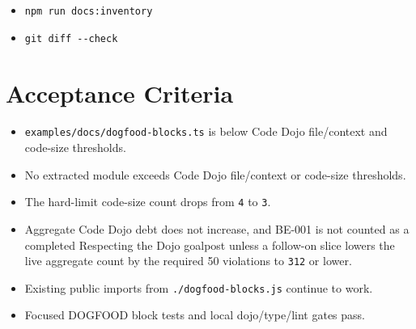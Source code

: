 \begin{itemize}
\item
  \texttt{n\allowbreak{}p\allowbreak{}m\allowbreak{} \allowbreak{}r\allowbreak{}u\allowbreak{}n\allowbreak{} \allowbreak{}d\allowbreak{}o\allowbreak{}c\allowbreak{}s\allowbreak{}:\allowbreak{}i\allowbreak{}n\allowbreak{}v\allowbreak{}e\allowbreak{}n\allowbreak{}t\allowbreak{}o\allowbreak{}r\allowbreak{}y}
\item
  \texttt{g\allowbreak{}i\allowbreak{}t\allowbreak{} \allowbreak{}d\allowbreak{}i\allowbreak{}f\allowbreak{}f\allowbreak{} \allowbreak{}-\allowbreak{}-\allowbreak{}c\allowbreak{}h\allowbreak{}e\allowbreak{}c\allowbreak{}k}
\end{itemize}

\section{Acceptance Criteria}\label{record-253-acceptance-criteria}

\begin{itemize}
\tightlist
\item
  \texttt{e\allowbreak{}x\allowbreak{}a\allowbreak{}m\allowbreak{}p\allowbreak{}l\allowbreak{}e\allowbreak{}s\allowbreak{}/\allowbreak{}d\allowbreak{}o\allowbreak{}c\allowbreak{}s\allowbreak{}/\allowbreak{}d\allowbreak{}o\allowbreak{}g\allowbreak{}f\allowbreak{}o\allowbreak{}o\allowbreak{}d\allowbreak{}-\allowbreak{}b\allowbreak{}l\allowbreak{}o\allowbreak{}c\allowbreak{}k\allowbreak{}s\allowbreak{}.\allowbreak{}t\allowbreak{}s} is below Code Dojo file/context and code-size thresholds.
\item
  No extracted module exceeds Code Dojo file/context or code-size thresholds.
\item
  The hard-limit code-size count drops from \texttt{4} to \texttt{3}.
\item
  Aggregate Code Dojo debt does not increase, and BE-001 is not counted as a completed Respecting the Dojo goalpost unless a follow-on slice lowers the live aggregate count by the required 50 violations to \texttt{3\allowbreak{}1\allowbreak{}2} or lower.
\item
  Existing public imports from \texttt{.\allowbreak{}/\allowbreak{}d\allowbreak{}o\allowbreak{}g\allowbreak{}f\allowbreak{}o\allowbreak{}o\allowbreak{}d\allowbreak{}-\allowbreak{}b\allowbreak{}l\allowbreak{}o\allowbreak{}c\allowbreak{}k\allowbreak{}s\allowbreak{}.\allowbreak{}j\allowbreak{}s} continue to work.
\item
  Focused DOGFOOD block tests and local dojo/type/lint gates pass.
\end{itemize}

